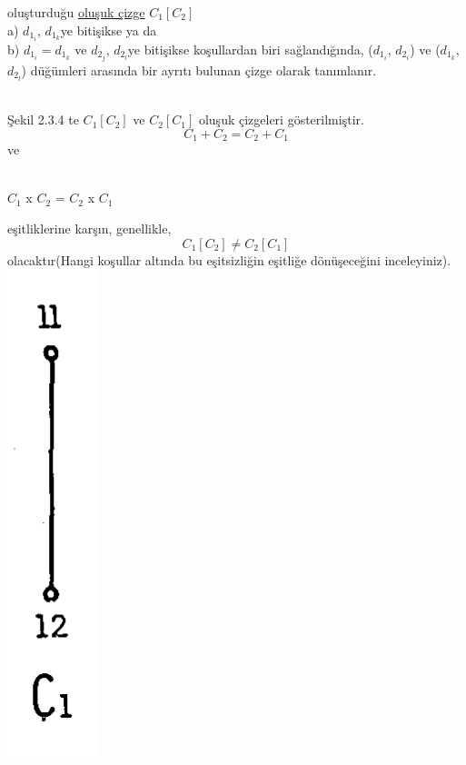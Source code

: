 \documentclass[11pt]{amsbook}
\begin{document}

   
   oluşturduğu \underline{oluşuk çizge} \(C_1[C_2]\)
   \\a) \(d_1_i\), \(d_1_k\)ye bitişikse ya da
   \\b) \(d_1_i = d_1_k\) ve \(d_2_j\), \(d_2_l\)ye bitişikse koşullardan biri sağlandığında, (\(d_1_i\), \(d_2_i\)) ve (\(d_1_k\), \(d_2_l\)) düğümleri arasında bir ayrıtı bulunan çizge olarak tanımlanır.

   \\ Şekil 2.3.4 te \(C_1[C_2]\) ve \(C_2[C_1]\) oluşuk çizgeleri gösterilmiştir.
   \[ C_1 + C_2 = C_2 + C_1\]
   ve
   \begin{center}
   \\\(C_1\) x \(C_2\) = \(C_2\) x \(C_1\)
    \end{center}
    eşitliklerine karşın, genellikle, 
    \[ C_1[C_2] \neq C_2[C_1]\]
    olacaktır(Hangi koşullar altında bu eşitsizliğin eşitliğe dönüşeceğini inceleyiniz).
     \\\includegraphics[scale = 0.7]{images/ceyhun-069_fig1}
\end{document}
